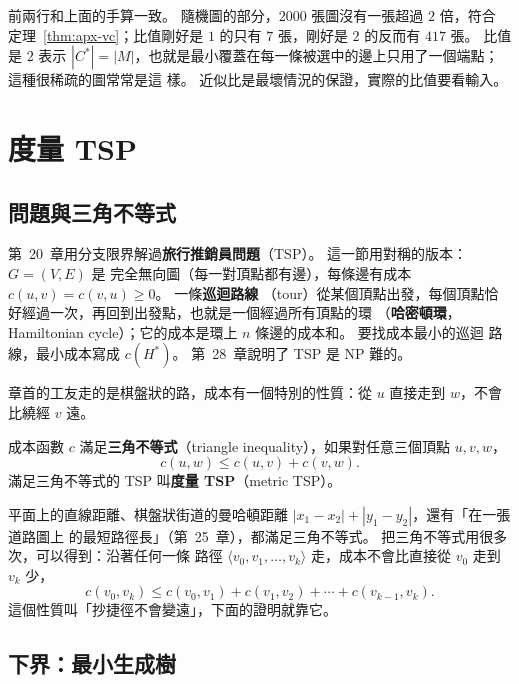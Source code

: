 
前兩行和上面的手算一致。 隨機圖的部分，$2000$ 張圖沒有一張超過 $2$ 倍，符合
定理~\ref{thm:apx-vc}；比值剛好是 $1$ 的只有 $7$ 張，剛好是 $2$ 的反而有 $417$ 張。 比值是 $2$
表示 $|C^*| = |M|$，也就是最小覆蓋在每一條被選中的邊上只用了一個端點；這種很稀疏的圖常常是這
樣。 近似比是最壞情況的保證，實際的比值要看輸入。

\section{度量 TSP}
\label{sec:apx-tsp}

\subsection{問題與三角不等式}

第~20~章用分支限界解過\textbf{旅行推銷員問題}（TSP）。 這一節用對稱的版本：$G = (V, E)$ 是
完全無向圖（每一對頂點都有邊），每條邊有成本 $c(u, v) = c(v, u) \ge 0$。 一條\textbf{巡迴路線}
（tour）從某個頂點出發，每個頂點恰好經過一次，再回到出發點，也就是一個經過所有頂點的環
（\textbf{哈密頓環}，Hamiltonian cycle）；它的成本是環上 $n$ 條邊的成本和。 要找成本最小的巡迴
路線，最小成本寫成 $c(H^*)$。 第~28~章說明了 TSP 是 NP 難的。

章首的工友走的是棋盤狀的路，成本有一個特別的性質：從 $u$ 直接走到 $w$，不會比繞經 $v$ 遠。

\begin{definition}[三角不等式]
\label{def:apx-triangle}
成本函數 $c$ 滿足\textbf{三角不等式}（triangle inequality），如果對任意三個頂點 $u, v, w$，
\[
c(u, w) \le c(u, v) + c(v, w).
\]
滿足三角不等式的 TSP 叫\textbf{度量 TSP}（metric TSP）。
\end{definition}

平面上的直線距離、棋盤狀街道的曼哈頓距離 $|x_1 - x_2| + |y_1 - y_2|$，還有「在一張道路圖上
的最短路徑長」（第~25~章），都滿足三角不等式。 把三角不等式用很多次，可以得到：沿著任何一條
路徑 $\langle v_0, v_1, \ldots, v_k \rangle$ 走，成本不會比直接從 $v_0$ 走到 $v_k$ 少，
\[
c(v_0, v_k) \le c(v_0, v_1) + c(v_1, v_2) + \cdots + c(v_{k-1}, v_k).
\]
這個性質叫「抄捷徑不會變遠」，下面的證明就靠它。

\subsection{下界：最小生成樹}


